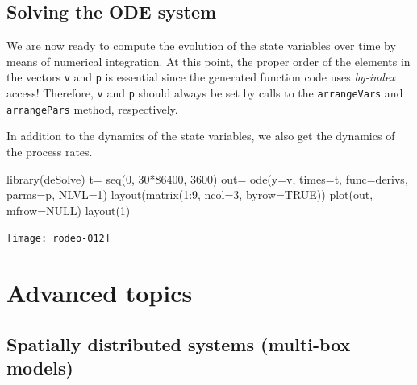 \documentclass[times,onecolumn]{article}
\begin{document}
\begin{Schunk}
\end{Schunk}

\subsection{Solving the ODE system} \label{sec:solve-R}

We are now ready to compute the evolution of the state variables over time by means of numerical integration. At this point, the proper order of the elements in the vectors \verb|v| and \verb|p| is essential since the generated function code uses \emph{by-index} access! Therefore, \verb|v| and \verb|p| should always be set by calls to the \verb|arrangeVars| and \verb|arrangePars| method, respectively.

In addition to the dynamics of the state variables, we also get the dynamics of the process rates.

\begin{Schunk}
\begin{Sinput}
 library(deSolve)
 t= seq(0, 30*86400, 3600)
 out= ode(y=v, times=t, func=derivs, parms=p, NLVL=1)
 layout(matrix(1:9, ncol=3, byrow=TRUE))
 plot(out, mfrow=NULL)
 layout(1)
\end{Sinput}
\end{Schunk}
\texttt{[image: rodeo-012]}


\clearpage
\section{Advanced topics} \label{sec:advanced}


\subsection{Spatially distributed systems (multi-box models)} \label{sec:advanced:multibox}
\end{document}
